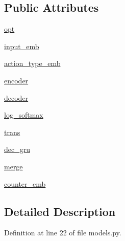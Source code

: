 \subsection*{Public Attributes}
\begin{DoxyCompactItemize}
\item 
\hyperlink{classmastering__the__dungeon_1_1agents_1_1graph__world2_1_1models_1_1ObjectChecklistModel_aaed641658fa203252d4b76862370bea0}{opt}
\item 
\hyperlink{classmastering__the__dungeon_1_1agents_1_1graph__world2_1_1models_1_1ObjectChecklistModel_a9a895da645756672771d269b51392802}{input\+\_\+emb}
\item 
\hyperlink{classmastering__the__dungeon_1_1agents_1_1graph__world2_1_1models_1_1ObjectChecklistModel_a21c0616875ad2f5f4457286fb9847052}{action\+\_\+type\+\_\+emb}
\item 
\hyperlink{classmastering__the__dungeon_1_1agents_1_1graph__world2_1_1models_1_1ObjectChecklistModel_af84908af2be7c0b304e49e0d53b611eb}{encoder}
\item 
\hyperlink{classmastering__the__dungeon_1_1agents_1_1graph__world2_1_1models_1_1ObjectChecklistModel_a8e5e4a8bc425c33000a62162b1228691}{decoder}
\item 
\hyperlink{classmastering__the__dungeon_1_1agents_1_1graph__world2_1_1models_1_1ObjectChecklistModel_a6a759ef028b4aed5d2ed0097d5c0569f}{log\+\_\+softmax}
\item 
\hyperlink{classmastering__the__dungeon_1_1agents_1_1graph__world2_1_1models_1_1ObjectChecklistModel_a8322505c97d6bff2df39ef10381e7db0}{trans}
\item 
\hyperlink{classmastering__the__dungeon_1_1agents_1_1graph__world2_1_1models_1_1ObjectChecklistModel_a5f90dccceff07e0e306c85c5c081dddb}{dec\+\_\+gru}
\item 
\hyperlink{classmastering__the__dungeon_1_1agents_1_1graph__world2_1_1models_1_1ObjectChecklistModel_a68072a25c2792c1ab2daf2cf12c3ed04}{merge}
\item 
\hyperlink{classmastering__the__dungeon_1_1agents_1_1graph__world2_1_1models_1_1ObjectChecklistModel_ad2c82d67d10cb20660da774c1cc7ed8b}{counter\+\_\+emb}
\end{DoxyCompactItemize}


\subsection{Detailed Description}


Definition at line 22 of file models.\+py.



